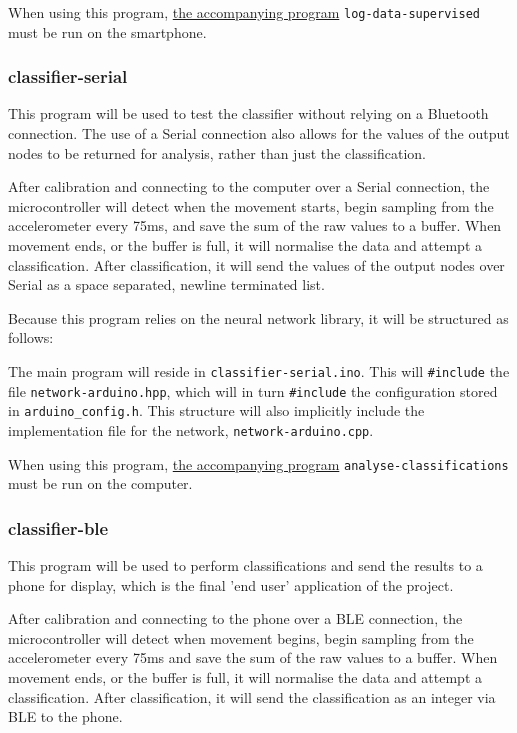\documentclass[a4paper]{article}
\begin{document}
When using this program, \hyperref[subsubsec:dc_asa_logger]{the accompanying program} \lstinline{log-data-supervised} must be run on the smartphone.

\subsubsection{classifier-serial}
\label{subsubsec:dc_msa_classifierserial}

This program will be used to test the classifier without relying on a Bluetooth connection. The use of a Serial connection also allows for the values of the output nodes to be returned for analysis, rather than just the classification.

After calibration and connecting to the computer over a Serial connection, the microcontroller will detect when the movement starts, begin sampling from the accelerometer every 75ms, and save the sum of the raw values to a buffer. When movement ends, or the buffer is full, it will normalise the data and attempt a classification. After classification, it will send the values of the output nodes over Serial as a space separated, newline terminated list.

Because this program relies on the neural network library, it will be structured as follows:

The main program will reside in \lstinline{classifier-serial.ino}. This will \lstinline{#include} the file \lstinline{network-arduino.hpp}, which will in turn \lstinline{#include} the configuration stored in \lstinline{arduino_config.h}. 
This structure will also implicitly include the implementation file for the network, \lstinline{network-arduino.cpp}.


When using this program, \hyperref[subsubsec:dc_csa_analyse]{the accompanying program} \lstinline{analyse-classifications} must be run on the computer.

\subsubsection{classifier-ble}%
\label{subsubsec:dc_msa_classifierble}

This program will be used to perform classifications and send the results to a phone for display, which is the final 'end user' application of the project.

After calibration and connecting to the phone over a BLE connection, the microcontroller will detect when movement begins, begin sampling from the accelerometer every 75ms and save the sum of the raw values to a buffer. When movement ends, or the buffer is full, it will normalise the data and attempt a classification. After classification, it will send the classification as an integer via BLE to the phone.
\end{document}
